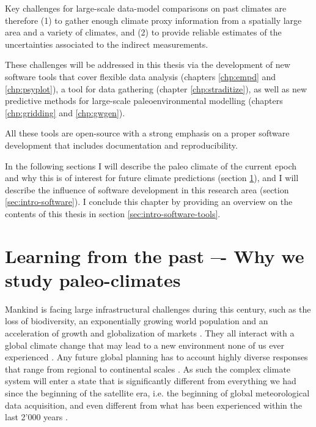 \begin{refsection}
Key challenges for large-scale data-model comparisons on past climates are therefore (1) to gather enough climate proxy information from a spatially large area and a variety of climates, and (2) to provide reliable estimates of the uncertainties associated to the indirect measurements.

These challenges will be addressed in this thesis via the development of new software tools that cover flexible data analysis (chapters \ref{chp:empd} and \ref{chp:psyplot}), a tool for data gathering (chapter \ref{chp:straditize}), as well as new predictive methods for large-scale paleoenvironmental modelling (chapters \ref{chp:gridding} and \ref{chp:gwgen}).

All these tools are open-source with a strong emphasis on a proper software development that includes documentation and reproducibility. 

In the following sections I will describe the paleo climate of the current epoch and why this is of interest for future climate predictions (section \ref{sec:intro-paleo}), and I will describe the influence of software development in this research area (section \ref{sec:intro-software}). I conclude this chapter by providing an overview on the contents of this thesis in section \ref{sec:intro-software-tools}.

\section{Learning from the past –- Why we study paleo-climates} \label{sec:intro-paleo}

Mankind is facing large infrastructural challenges during this century, such as the loss of biodiversity, an exponentially growing world population and an acceleration of growth and globalization of markets \citep{CeballosEhrlichBarnoskyEtAl2015, UniNations2019, WorldBank2002}. They all interact with a global climate change that may lead to a new environment none of us ever experienced \citep{CollinsKnuttiArblasterEtAl2013}. Any future global planning has to account highly diverse responses that range from regional to continental scales \citep{ChristensenKrishnaKumarAldrianEtAl2013}. As such the complex climate system will enter a state that is significantly different from everything we had since the beginning of the satellite era, i.e. the beginning of global meteorological data acquisition, and even different from what has been experienced within the last 2'000 years \citep{NeukomSteigerGomezNavarroEtAl2019, NeukomBarbozaErbEtAl2019}.


\end{refsection}
